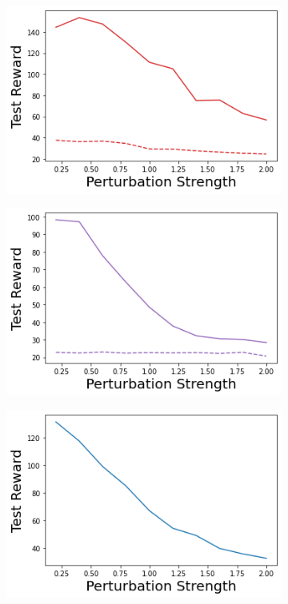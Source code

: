 \begin{figure}
     \begin{subfigure}{.24\textwidth}
        \includegraphics[width=\textwidth]{sections/011_icml2022/resources/state_shift-DropOut-CartPoleShift-v0-mean_reward_.png}
    \end{subfigure}
    \begin{subfigure}{.24\textwidth}
        \includegraphics[width=\textwidth]{sections/011_icml2022/resources/state_shift-Ensemble-CartPoleShift-v0-mean_reward_.png}
    \end{subfigure}
    \begin{subfigure}{.24\textwidth}
        \includegraphics[width=\textwidth]{sections/011_icml2022/resources/state_shift-DKL-CartPoleShift-v0-mean_reward_.png}

\end{subfigure}
\end{figure}
